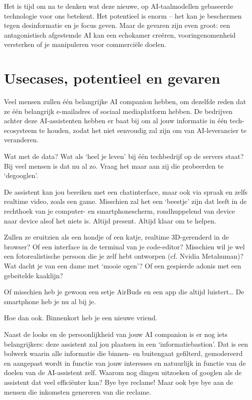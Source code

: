 \documentclass[twocolumn]{article}
\begin{document}
Het is tijd om na te denken wat deze nieuwe, op AI-taalmodellen gebaseerde technologie voor ons betekent.
Het potentieel is enorm -- het kan je beschermen tegen desinformatie en je focus geven.
Maar de gevaren zijn even groot: een antagonistisch afgestemde AI kan een echokamer creëren, vooringenomenheid versterken of je manipuleren voor commerciële doelen.

\section*{Usecases, potentieel en gevaren}

Veel mensen zullen één belangrijke AI companion hebben, om dezelfde reden dat ze één belangrijk e-mailadres of sociaal mediaplatform hebben.
De bedrijven achter deze AI-assistenten hebben er baat bij om al jouw informatie in één tech-ecosysteem te houden, zodat het niet eenvoudig zal zijn om van AI-leverancier te veranderen.

Wat met de data?
Wat als `heel je leven' bij één techbedrijf op de servers staat?
Bij veel mensen is dat nu al zo.
Vraag het maar aan zij die probeerden te `degooglen'.

De assistent kan jou bereiken met een chatinterface, maar ook via spraak en zelfs realtime video, zoals een game.
Misschien zal het een `beestje' zijn dat leeft in de rechthoek van je computer- en smartphonescherm, rondhuppelend van device naar device alsof het niets is.
Altijd present.
Altijd klaar om te helpen.

Zullen ze eruitzien als een hondje of een katje, realtime 3D-gerenderd in de browser?
Of een interface in de terminal van je code-editor?
Misschien wil je wel een fotorealistische persoon die je zelf hebt ontworpen (cf. Nvidia Metahuman)?
Wat dacht je van een dame met `mooie ogen'?
Of een gespierde adonis met een gebeitelde kaaklijn?

Of misschien heb je gewoon een setje AirBuds en een app die altijd luistert\ldots{}
De smartphone heb je nu al bij je.

Hoe dan ook.
Binnenkort heb je een nieuwe vriend.

Naast de looks en de persoonlijkheid van jouw AI companion is er nog iets belangrijkers: deze assistent zal jou plaatsen in een `informatiebastion'.
Dat is een bolwerk waarin alle informatie die binnen- en buitengaat gefilterd, gemodereerd en aangepast wordt in functie van jouw interesses en natuurlijk in functie van de doelen van de AI-assistent zelf.
Waarom nog dingen uitzoeken of googlen als de assistent dat veel efficiënter kan?
Bye bye reclame!
Maar ook bye bye aan de mensen die inkomsten genereren van die reclame.
\end{document}

